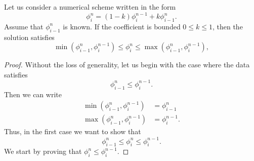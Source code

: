 \documentclass[../thesis.tex]{subfiles}
\begin{document}
\begin{theorem}
    Let us consider a numerical scheme written in the form
    \begin{equation}\label{eqn:solution-as-interpolation}
    \phi_{i}^{n} =
    (1-k)\phi_{i}^{n-1} + k\phi_{i-1}^{n}.
    \end{equation}
    Assume that \(\phi_{i-1}^{n}\) is known. If the coefficient is bounded \(0 \leq k \leq 1\), then the solution satisfies
    \begin{equation}\label{eqn:implicit-upwind-range-condition-theorem}
        \min\left( \phi_{i-1}^{n},\phi_{i}^{n-1} \right)
        \leq
        \phi_{i}^{n}
        \leq
        \max\left( \phi_{i-1}^{n},\phi_{i}^{n-1} \right),
    \end{equation}
    \begin{proof}
        Without the loss of generality, let us begin with the case where the data satisfies
        \begin{equation}\label{eqn:implicit-upwind-range-condition-theorem-case-1-data}
            \phi_{i-1}^{n} \leq \phi_{i}^{n-1}.
        \end{equation}
        Then we can write
        \begin{equation}
            \begin{split}
                \min\left( \phi_{i-1}^{n},\phi_{i}^{n-1} \right) &= \phi_{i-1}^{n}\\
                \max\left( \phi_{i-1}^{n},\phi_{i}^{n-1} \right) &= \phi_{i}^{n-1}.
            \end{split}
        \end{equation}
        Thus, in the first case we want to show that
        \begin{equation}\label{eqn:implicit-upwind-range-condition-theorem-case-1}
            \phi_{i-1}^{n}
            \leq
            \phi_{i}^{n}
            \leq
            \phi_{i}^{n-1}.
        \end{equation}
        We start by proving that \(\phi_{i}^{n} \leq \phi_{i}^{n-1}\).


\end{proof}
\end{theorem}
\end{document}
